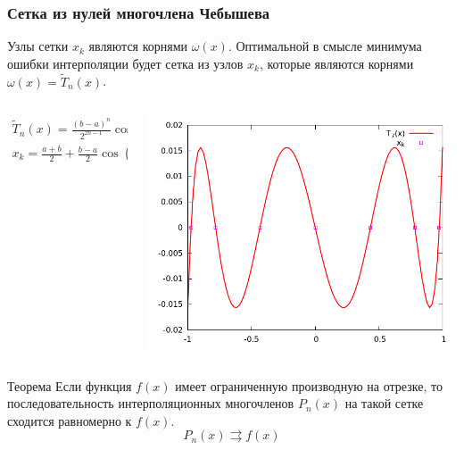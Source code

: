 \documentclass[aspectratio=43,unicode]{beamer}
\begin{document}
\begin{frame}
\frametitle{Сетка из нулей многочлена Чебышева}
	Узлы сетки $x_k$ являются корнями $\omega(x)$. Оптимальной в смысле минимума ошибки интерполяции будет
	сетка из узлов $x_k$, которые являются корнями $\omega(x) = \tilde{T}_n(x)$.
	\pause
	\begin{columns}[T]
	\begin{column}{0.6\textwidth}
	\begin{gather*}
	\tilde{T}_n(x) = \frac{(b-a)^n}{2^{2n-1}}
		\cos n \arccos \frac{2x-a-b}{b-a}\\
	x_k = \frac{a+b}{2} + \frac{b-a}{2} \cos \left(\frac{2k-1}{2n}\pi\right)
	\end{gather*}
	\end{column}
	\begin{column}{0.4\textwidth}
	\includegraphics[height=0.3\textheight]{cheb.png}
	\end{column}
	\end{columns}
	\pause

	\begin{block}{Теорема}
		Если функция $f(x)$ имеет ограниченную производную на отрезке, то последовательность
		интерполяционных многочленов $P_n(x)$ на такой сетке сходится равномерно к $f(x)$.
		\[
		P_n(x) \rightrightarrows f(x)
		\]
	\end{block}
\end{frame}
\end{document}
